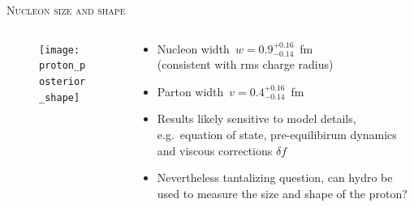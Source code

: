 \documentclass[aspectratio=169]{beamer}
\begin{document}
\begin{frame}{\scshape Nucleon size and shape}
  \begin{columns}
    \begin{column}{.45\textwidth}
      \begin{figure}
        \texttt{[image: proton\_posterior\_shape]}
      \end{figure}
    \end{column}
    \begin{column}{.55\textwidth}
      \begin{itemize}
        \item Nucleon width\, $w = 0.9_{-0.14}^{+0.16}$~fm\\[.5ex]
          (consistent with rms charge radius)\\[2ex]
        \item Parton width\, $v = 0.4_{-0.14}^{+0.16}$~fm\\[2ex]
        \item Results likely sensitive to model details,
          e.g.\ equation of state, pre-equilibirum dynamics and viscous
          corrections $\delta f$\\[2ex]
        \item Nevertheless tantalizing question, can hydro be used
          to measure the size and shape of the proton?
      \end{itemize}
    \end{column}
  \end{columns}
\end{frame}
\end{document}
